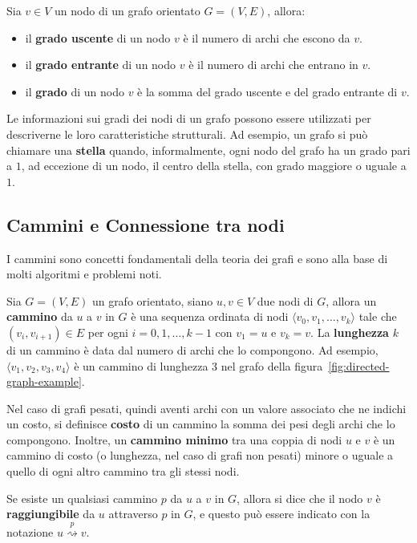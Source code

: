 Sia $v \in V$ un nodo di un grafo orientato $G = (V, E)$, allora:
\begin{itemize}
    \item il \textbf{grado uscente} di un nodo $v$ \`e il numero di archi che escono da $v$.
    \item il \textbf{grado entrante} di un nodo $v$ \`e il numero di archi che entrano in $v$.
    \item il \textbf{grado} di un nodo $v$ \`e la somma del grado uscente e del grado entrante di $v$.
\end{itemize}

Le informazioni sui gradi dei nodi di un grafo possono essere utilizzati per descriverne le loro caratteristiche
strutturali.
Ad esempio, un grafo si può chiamare una \textbf{stella} quando, informalmente, ogni nodo del grafo ha un
grado pari a $1$, ad eccezione di un nodo, il centro della stella, con grado maggiore o uguale a $1$.

\subsection{Cammini e Connessione tra nodi}\label{subsec:cammini}


I cammini sono concetti fondamentali della teoria dei grafi e sono alla base di molti algoritmi e problemi noti. \newline

Sia $G = (V, E)$ un grafo orientato, siano $u, v \in V$ due nodi di $G$, allora un \textbf{cammino} da $u$ a $v$ in $G$
\`e una sequenza ordinata di nodi $\langle v_0, v_1, \ldots, v_k \rangle$ tale che $(v_i, v_{i+1}) \in E$ per ogni
$i = 0, 1, \ldots, k-1$ con $v_1 = u$ e $v_k = v$.
La \textbf{lunghezza} $k$ di un cammino \`e data dal numero di archi che lo compongono.
Ad esempio, $\langle v_1, v_2, v_3, v_4 \rangle$ \`e un cammino di lunghezza 3 nel grafo della
figura~\ref{fig:directed-graph-example}.

Nel caso di grafi pesati, quindi aventi archi con un valore associato che ne indichi un costo, si definisce
\textbf{costo} di un cammino la somma dei pesi degli archi che lo compongono.
Inoltre, un \textbf{cammino minimo} tra una coppia di nodi $u$ e $v$ è un cammino di costo (o lunghezza, nel caso
di grafi non pesati) minore o uguale a quello di ogni altro cammino tra gli stessi nodi.

Se esiste un qualsiasi cammino $p$ da $u$ a $v$ in $G$, allora si dice che il nodo $v$ \`e \textbf{raggiungibile} da
$u$ attraverso $p$ in $G$, e questo pu\`o essere indicato con la notazione $u \overset{p}{\rightsquigarrow} v$. \newline

